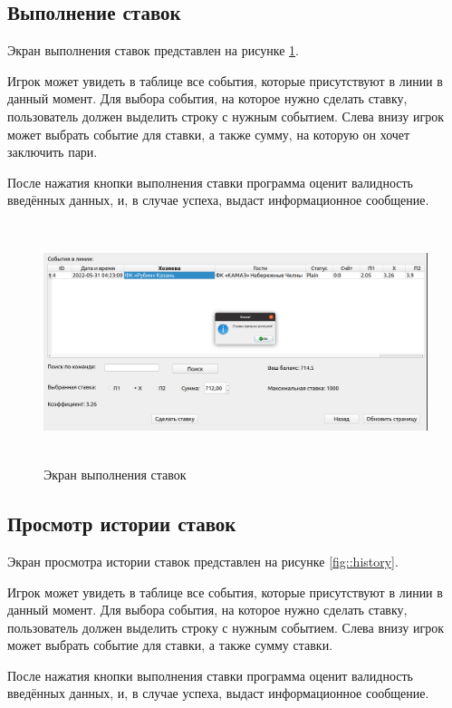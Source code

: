 \subsection{Выполнение ставок}
Экран выполнения ставок представлен на рисунке \ref{fig::bet}.

Игрок может увидеть в таблице все события, которые присутствуют в линии в данный момент.
Для выбора события, на которое нужно сделать ставку, пользователь должен выделить строку с нужным событием.
Слева внизу игрок может выбрать событие для ставки, а также сумму, на которую он хочет заключить пари.

После нажатия кнопки выполнения ставки программа оценит валидность введённых данных, и, в случае успеха, выдаст информационное сообщение.

\FloatBarrier
\begin{figure}[h]	
	\begin{center}
		\includegraphics[height = 7cm, width=\linewidth]{inc/bet.png}
	\end{center}
	\caption{Экран выполнения ставок}
	\label{fig::bet}
\end{figure}
\FloatBarrier

\subsection{Просмотр истории ставок}
Экран просмотра истории ставок представлен на рисунке \ref{fig::history}.

Игрок может увидеть в таблице все события, которые присутствуют в линии в данный момент.
Для выбора события, на которое нужно сделать ставку, пользователь должен выделить строку с нужным событием.
Слева внизу игрок может выбрать событие для ставки, а также сумму ставки.

После нажатия кнопки выполнения ставки программа оценит валидность введённых данных, и, в случае успеха, выдаст информационное сообщение.

